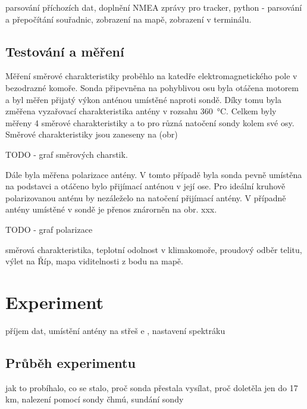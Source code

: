 \documentclass[twoside]{ctuthesis}
\theoremstyle{plain}
\theoremstyle{definition}
\theoremstyle{note}
\begin{document}
	parsování příchozích dat, doplnění NMEA zprávy pro tracker, python - parsování a přepočítání souřadnic, zobrazení na mapě, zobrazení v terminálu. 








	\section{Testování a měření}
	Měření směrové charakteristiky proběhlo na katedře elektromagnetického pole v bezodrazné komoře. Sonda připevněna na pohyblivou osu byla otáčena motorem a byl měřen přijatý výkon anténou umístěné naproti sondě. Díky tomu byla změřena vyzařovací charakteristika antény v rozsahu 360~°C. Celkem byly měřeny 4 směrové charakteristiky a to pro různá natočení sondy kolem své osy. Směrové charakteristiky jsou zaneseny na (obr)

	TODO - graf směrových charstik.

	Dále byla měřena polarizace antény. V tomto případě byla sonda pevně umístěna na podstavci a otáčeno bylo přijímací anténou v její ose. Pro ideální kruhově polarizovanou anténu by nezáleželo na natočení přijímací antény. V případně antény umístěné v sondě je přenos znárorněn na obr. xxx.

	TODO - graf polarizace


	směrová charakteristika, teplotní odolnost v klimakomoře, proudový odběr telitu, výlet na Říp, mapa viditelnosti z bodu na mapě. 


	
















	

\chapter{Experiment}
příjem dat, umístění antény na střeš e , nastavení spektráku
	\section{Průběh experimentu}
	jak to probíhalo, co se stalo, proč sonda přestala vysílat, proč doletěla jen do 17 km, nalezení pomocí sondy čhmú, sundání sondy
\end{document}
